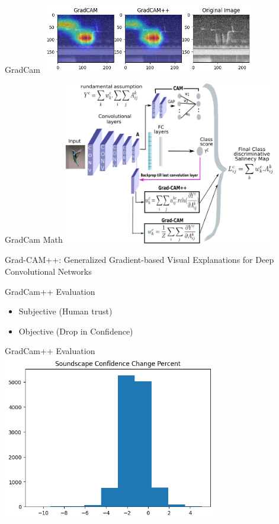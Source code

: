 \begin{frame}{GradCam}
    \centering
    \includegraphics[height=0.7\textheight,width=0.7\textwidth,keepaspectratio]{./images/screaming_gradcam_1.png}

\end{frame}
\begin{frame}{GradCam Math}
    \centering
    \includegraphics[height=0.7\textheight,width=0.7\textwidth,keepaspectratio]{./images/grad_cam_explination.png}

    Grad-CAM++: Generalized Gradient-based Visual Explanations for Deep Convolutional Networks
\end{frame}
\begin{frame}{GradCam++ Evaluation}
    \begin{itemize}
        \item Subjective (Human trust)
        \item Objective (Drop in Confidence)
    \end{itemize}
\end{frame}
\begin{frame}{GradCam++ Evaluation}
    \centering
    \includegraphics[height=0.7\textheight,width=0.7\textwidth,keepaspectratio]{./images/Soundscape_Confidence.png}
\end{frame}
